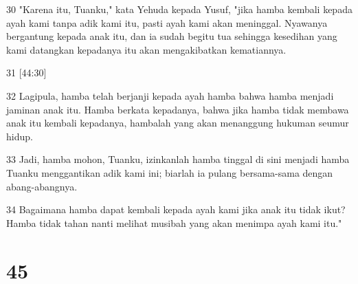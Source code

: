 \par 30 "Karena itu, Tuanku," kata Yehuda kepada Yusuf, "jika hamba kembali kepada ayah kami tanpa adik kami itu, pasti ayah kami akan meninggal. Nyawanya bergantung kepada anak itu, dan ia sudah begitu tua sehingga kesedihan yang kami datangkan kepadanya itu akan mengakibatkan kematiannya.
\par 31 [44:30]
\par 32 Lagipula, hamba telah berjanji kepada ayah hamba bahwa hamba menjadi jaminan anak itu. Hamba berkata kepadanya, bahwa jika hamba tidak membawa anak itu kembali kepadanya, hambalah yang akan menanggung hukuman seumur hidup.
\par 33 Jadi, hamba mohon, Tuanku, izinkanlah hamba tinggal di sini menjadi hamba Tuanku menggantikan adik kami ini; biarlah ia pulang bersama-sama dengan abang-abangnya.
\par 34 Bagaimana hamba dapat kembali kepada ayah kami jika anak itu tidak ikut? Hamba tidak tahan nanti melihat musibah yang akan menimpa ayah kami itu."

\chapter{45}

